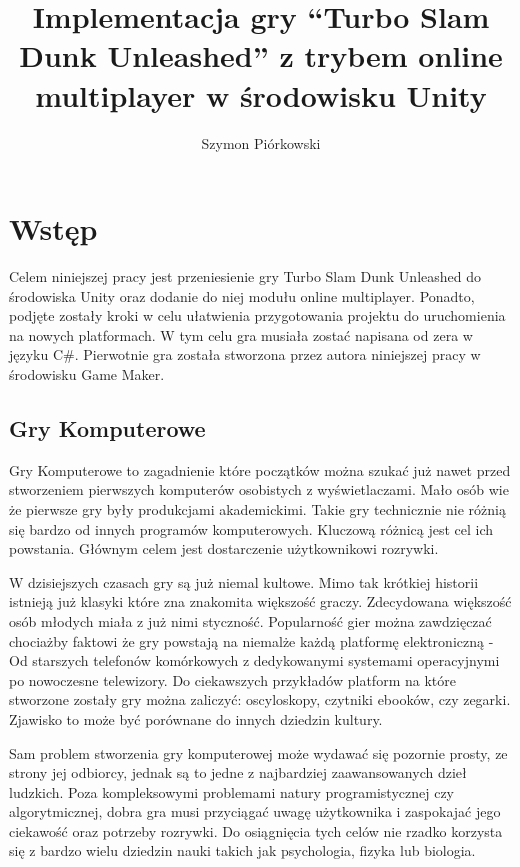 \documentclass[a4paper,12pt,twoside,openany]{report}
\title{Implementacja gry “Turbo Slam Dunk Unleashed” z trybem online multiplayer w środowisku Unity}
\author{Szymon Piórkowski}
\begin{document}
\maketitle

\chapter{Wstęp}
Celem niniejszej pracy jest przeniesienie gry Turbo Slam Dunk Unleashed do środowiska Unity oraz dodanie do niej modułu online multiplayer. Ponadto, podjęte zostały kroki w celu ułatwienia przygotowania projektu do uruchomienia na nowych platformach. W tym celu gra musiała zostać napisana od zera w języku C\#. Pierwotnie gra została stworzona przez autora niniejszej pracy w środowisku Game Maker.

\section{Gry Komputerowe}
Gry Komputerowe to zagadnienie które początków można szukać już nawet przed stworzeniem pierwszych komputerów osobistych z wyświetlaczami. Mało osób wie że pierwsze gry były produkcjami akademickimi. Takie gry technicznie nie różnią się bardzo od innych programów komputerowych. Kluczową różnicą jest cel ich powstania. Głównym celem jest dostarczenie użytkownikowi rozrywki.

W dzisiejszych czasach gry są już niemal kultowe. Mimo tak krótkiej historii istnieją już klasyki które zna znakomita większość graczy. Zdecydowana większość osób młodych miała z już nimi styczność. Popularność gier można zawdzięczać chociażby faktowi że gry powstają na niemalże każdą platformę elektroniczną - Od starszych telefonów komórkowych z dedykowanymi systemami operacyjnymi po nowoczesne telewizory. Do ciekawszych przykładów platform na które stworzone zostały gry można zaliczyć: oscyloskopy, czytniki ebooków, czy zegarki. Zjawisko to może być porównane do innych dziedzin kultury.

Sam problem stworzenia gry komputerowej może wydawać się pozornie prosty, ze strony jej odbiorcy, jednak są to jedne z najbardziej zaawansowanych dzieł ludzkich. Poza kompleksowymi problemami natury programistycznej czy algorytmicznej, dobra gra musi przyciągać uwagę użytkownika i zaspokajać jego ciekawość oraz potrzeby rozrywki. Do osiągnięcia tych celów nie rzadko korzysta się z bardzo wielu dziedzin nauki takich jak psychologia, fizyka lub biologia.
\end{document}
